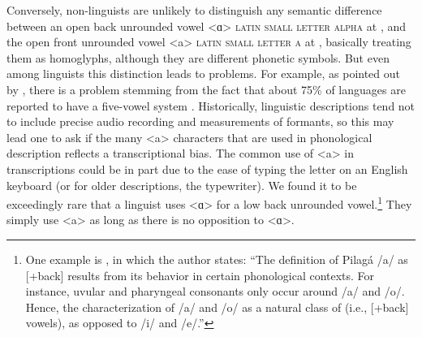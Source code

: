 Conversely, non-linguists are unlikely to distinguish any semantic difference
between an open back unrounded vowel <ɑ> \textsc{latin small letter alpha} at
, and the open front unrounded vowel <a> \textsc{latin small letter a}
at , basically treating them as homoglyphs, although they are
different phonetic symbols. But even among linguists this distinction leads to problems. For example, as
pointed out by \citet{Mielke2009}, there is a problem stemming from the fact
that about 75\% of languages are reported to have a five-vowel system
\citep{Maddieson1984}. Historically, linguistic descriptions tend not to include
precise audio recording and measurements of formants, so this may lead one to
ask if the many <a> characters that are used in phonological description
reflects a transcriptional bias. The common use of <a> in transcriptions could
be in part due to the ease of typing the letter on an English keyboard (or for
older descriptions, the typewriter). We found it to be exceedingly rare that a
linguist uses <ɑ> for a low back unrounded vowel.\footnote{One example is
\citet[75]{Vidal2001a}, in which the author states: ``The definition of Pilagá
/a/ as [+back] results from its behavior in certain phonological contexts. For
instance, uvular and pharyngeal consonants only occur around /a/ and /o/. Hence,
the characterization of /a/ and /o/ as a natural class of (i.e., [+back]
vowels), as opposed to /i/ and /e/.''} They simply use <a> as long as there is
no opposition to <ɑ>.


